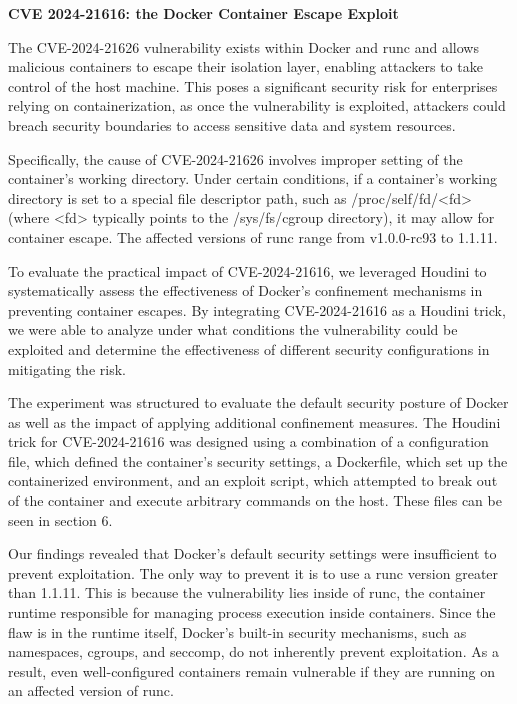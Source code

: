\noindent\textbf{CVE 2024-21616: the Docker Container Escape Exploit}


The CVE-2024-21626 vulnerability exists within Docker and runc and allows malicious containers to escape their isolation layer, enabling attackers to take control of the host machine. This poses a significant security risk for enterprises relying on containerization, as once the vulnerability is exploited, attackers could breach security boundaries to access sensitive data and system resources. 

Specifically, the cause of CVE-2024-21626 involves improper setting of the container’s working directory. Under certain conditions, if a container's working directory is set to a special file descriptor path, such as /proc/self/fd/<fd> (where <fd> typically points to the /sys/fs/cgroup directory), it may allow for container escape. The affected versions of runc range from v1.0.0-rc93 to 1.1.11.

To evaluate the practical impact of CVE-2024-21616, we leveraged Houdini to systematically assess the effectiveness of Docker’s confinement mechanisms in preventing container escapes. By integrating CVE-2024-21616 as a Houdini trick, we were able to analyze under what conditions the vulnerability could be exploited and determine the effectiveness of different security configurations in mitigating the risk.

The experiment was structured to evaluate the default security posture of Docker as well as the impact of applying additional confinement measures. The Houdini trick for CVE-2024-21616 was designed using a combination of a configuration file, which defined the container’s security settings, a Dockerfile, which set up the containerized environment, and an exploit script, which attempted to break out of the container and execute arbitrary commands on the host. These files can be seen in section 6.

Our findings revealed that Docker’s default security settings were insufficient to prevent exploitation. The only way to prevent it is to use a runc version greater than 1.1.11. This is because the vulnerability lies inside of runc, the container runtime responsible for managing process execution inside containers. Since the flaw is in the runtime itself, Docker’s built-in security mechanisms, such as namespaces, cgroups, and seccomp, do not inherently prevent exploitation. As a result, even well-configured containers remain vulnerable if they are running on an affected version of runc.